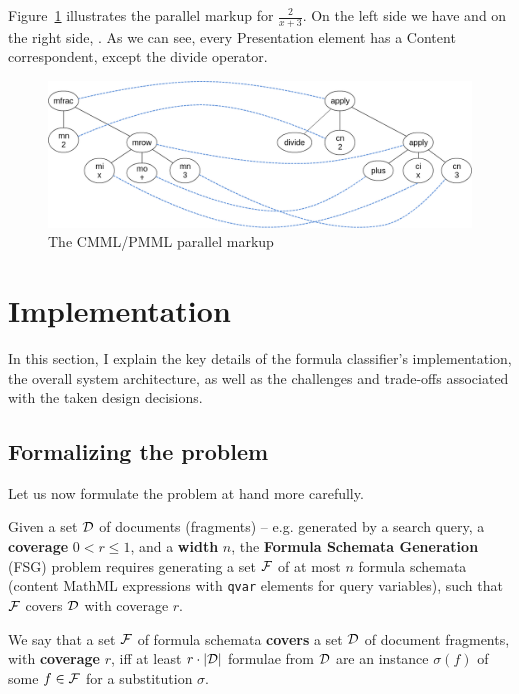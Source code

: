 Figure~\ref{fig:crossreference_diag} illustrates the parallel markup for
$\frac{2}{x+3}$. On the left side we have \pmml and on the right side, \cmml.
As we can see, every Presentation element has a Content correspondent, except
the \textsf{divide} operator.

\begin{figure}[ht]\centering
    \includegraphics[scale=0.3]{img/crossreference_diag.png}
    \caption{The CMML/PMML parallel markup}\label{fig:crossreference_diag}
\end{figure}
\FloatBarrier


\section{Implementation}\label{sec:implementation}

In this section, I explain the key details of the formula classifier's
implementation, the overall system architecture, as well as the challenges and
trade-offs associated with the taken design decisions.

\subsection{Formalizing the problem}\label{subsec:formal_problem}
Let us now formulate the problem at hand more carefully.

\begin{definition}
  Given a set $\mathcal{D}$ of documents (fragments) -- e.g. generated by a search
  query, a \textbf{coverage} $0<r\leq1$, and a \textbf{width} $n$, the
  \textbf{Formula Schemata Generation} (FSG) problem requires generating
  a set $\mathcal{F}$ of at most $n$ formula schemata (content MathML expressions with
  \lstinline|qvar| elements for query variables), such that $\mathcal{F}$ covers $\mathcal{D}$
  with coverage $r$.
\end{definition}

\begin{definition}
  We say that a set $\mathcal{F}$ of formula schemata \textbf{covers} a set $\mathcal{D}$ of
  document fragments, with \textbf{coverage} $r$, iff at least $r \cdot |\mathcal{D}|$
  formulae from $\mathcal{D}$ are an instance $\sigma(f)$ of some $f\in\mathcal{F}$ for a
  substitution $\sigma$.
\end{definition}


